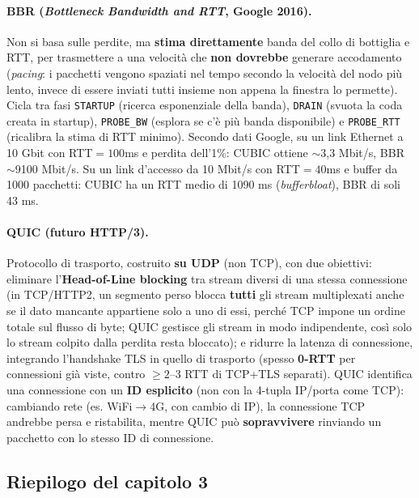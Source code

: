 \documentclass[12pt, a4paper]{article}
\begin{document}
\paragraph{BBR (\textit{Bottleneck Bandwidth and RTT}, Google 2016).} Non si basa sulle perdite, ma \textbf{stima direttamente} banda del collo di bottiglia e RTT, per trasmettere a una velocità che \textbf{non dovrebbe} generare accodamento (\textit{pacing}: i pacchetti vengono spaziati nel tempo secondo la velocità del nodo più lento, invece di essere inviati tutti insieme non appena la finestra lo permette). Cicla tra fasi \texttt{STARTUP} (ricerca esponenziale della banda), \texttt{DRAIN} (svuota la coda creata in startup), \texttt{PROBE\_BW} (esplora se c'è più banda disponibile) e \texttt{PROBE\_RTT} (ricalibra la stima di RTT minimo). Secondo dati Google, su un link Ethernet a 10 Gbit con RTT$=100$ms e perdita dell'1\%: CUBIC ottiene $\sim$3,3 Mbit/s, BBR $\sim$9100 Mbit/s. Su un link d'accesso da 10 Mbit/s con RTT$=40$ms e buffer da 1000 pacchetti: CUBIC ha un RTT medio di 1090 ms (\textit{bufferbloat}), BBR di soli 43 ms.

\paragraph{QUIC (futuro HTTP/3).} Protocollo di trasporto, costruito \textbf{su UDP} (non TCP), con due obiettivi: eliminare l'\textbf{Head-of-Line blocking} tra stream diversi di una stessa connessione (in TCP/HTTP2, un segmento perso blocca \textbf{tutti} gli stream multiplexati anche se il dato mancante appartiene solo a uno di essi, perché TCP impone un ordine totale sul flusso di byte; QUIC gestisce gli stream in modo indipendente, così solo lo stream colpito dalla perdita resta bloccato); e ridurre la latenza di connessione, integrando l'handshake TLS in quello di trasporto (spesso \textbf{0-RTT} per connessioni già viste, contro $\geq 2$--$3$ RTT di TCP+TLS separati). QUIC identifica una connessione con un \textbf{ID esplicito} (non con la 4-tupla IP/porta come TCP): cambiando rete (es. WiFi$\to$4G, con cambio di IP), la connessione TCP andrebbe persa e ristabilita, mentre QUIC può \textbf{sopravvivere} rinviando un pacchetto con lo stesso ID di connessione.

\subsection{Riepilogo del capitolo 3}
\end{document}
